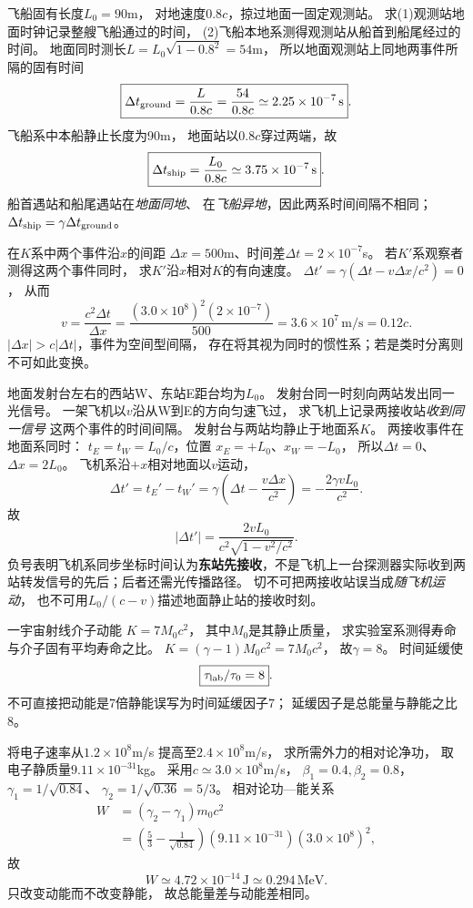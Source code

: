 \problemtext 飞船固有长度$L_0=90$m，
对地速度$0.8c$，掠过地面一固定观测站。
求(1)观测站地面时钟记录整艘飞船通过的时间，
(2)飞船本地系测得观测站从船首到船尾经过的时间。
\workings
地面同时测长$L=L_0\sqrt{1-0.8^2}=54$m，
所以地面观测站上同地两事件所隔的固有时间
\[
\boxed{\Delta t_{\rm ground}=
\frac L{0.8c}=\frac{54}{0.8c}
\simeq2.25\times10^{-7}\,\mathrm s}.
\]
飞船系中本船静止长度为90m，
地面站以$0.8c$穿过两端，故
\[
\boxed{\Delta t_{\rm ship}=
\frac{L_0}{0.8c}
\simeq3.75\times10^{-7}\,\mathrm s}.
\]
\crosscheck 船首遇站和船尾遇站在\emph{地面同地}、
在\emph{飞船异地}，因此两系时间间隔不相同；
$\Delta t_{\rm ship}=\gamma\Delta t_{\rm ground}$。

\problemtext 在$K$系中两个事件沿$x$的间距
$\Delta x=500$m、时间差$\Delta t=2\times10^{-7}$s。
若$K'$系观察者测得这两个事件同时，
求$K'$沿$x$相对$K$的有向速度。
\workings
$\Delta t'=\gamma(\Delta t-v\Delta x/c^2)=0$，
从而
\[
\boxed{v=\frac{c^2\Delta t}{\Delta x}
=\frac{(3.0\times10^8)^2(2\times10^{-7})}{500}
=3.6\times10^7\,\mathrm{m/s}=0.12c}.
\]
\crosscheck $|\Delta x|>c|\Delta t|$，事件为空间型间隔，
存在将其视为同时的惯性系；若是类时分离则不可如此变换。

\problemtext 地面发射台左右的西站W、东站E距台均为$L_0$。
发射台同一时刻向两站发出同一光信号。
一架飞机以$v$沿从W到E的方向匀速飞过，
求飞机上记录两接收站\emph{收到同一信号}
这两个事件的时间间隔。
\workings
发射台与两站均静止于地面系$K$。
两接收事件在地面系同时：
$t_E=t_W=L_0/c$，位置
$x_E=+L_0$、$x_W=-L_0$，
所以$\Delta t=0$、$\Delta x=2L_0$。
飞机系沿$+x$相对地面以$v$运动，
\[
\Delta t'=t_E'-t_W'
=\gamma\left(\Delta t-\frac{v\Delta x}{c^2}\right)
=-\frac{2\gamma vL_0}{c^2}.
\]
故
\[
\boxed{|\Delta t'|=
\frac{2vL_0}{c^2\sqrt{1-v^2/c^2}}}.
\]
负号表明飞机系同步坐标时间认为\textbf{东站先接收}，不是飞机上一台探测器实际收到两站转发信号的先后；后者还需光传播路径。
\crosscheck 切不可把两接收站误当成\emph{随飞机运动}，
也不可用$L_0/(c-v)$描述地面静止站的接收时刻。

\problemtext 一宇宙射线介子动能
$K=7M_0c^2$，
其中$M_0$是其静止质量，
求实验室系测得寿命与介子固有平均寿命之比。
\workings
$K=(\gamma-1)M_0c^2=7M_0c^2$，
故$\gamma=8$。
时间延缓使
\[
\boxed{\tau_{\rm lab}/\tau_0=8}.
\]
\crosscheck 不可直接把动能是7倍静能误写为时间延缓因子7；
延缓因子是总能量与静能之比8。

\problemtext 将电子速率从$1.2\times10^8$m/s
提高至$2.4\times10^8$m/s，
求所需外力的相对论净功，
取电子静质量$9.11\times10^{-31}$kg。
\workings
采用$c\simeq3.0\times10^8$m/s，
$\beta_1=0.4,\beta_2=0.8$，
$\gamma_1=1/\sqrt{0.84}$、
$\gamma_2=1/\sqrt{0.36}=5/3$。
相对论功—能关系
\[
\begin{aligned}
W&=(\gamma_2-\gamma_1)m_0c^2\\
&=\left(\frac53-\frac1{\sqrt{0.84}}\right)
(9.11\times10^{-31})(3.0\times10^8)^2,
\end{aligned}
\]
故
\[
\boxed{W\simeq4.72\times10^{-14}\,\mathrm J
\simeq0.294\,\mathrm{MeV}}.
\]
\crosscheck 只改变动能而不改变静能，
故总能量差与动能差相同。

